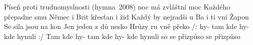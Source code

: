 \begin{TEXT}{Píseň proti trudnomyslnosti (hymna~2008)}
\SLOKA[]  noc má zvláštní moc \NL
Každého přepadne smu \NL
Němec i Brit křesťan i žid \NL
Každý by nejradši u \NL
Ba i ti vní Žapon \NL
Se sila jsou na kon \NL
Jen jeden z dů nesko \NL
Hrůzy ru vně překo 
\SLOKA[] /:  hy- tam kde hy- kde hynuli  :/ \NL
Tam kde hy- tam kde hy- kde hynuli so \NL
{} se přizpůso  se přizpůso  \NL
\end{TEXT}
